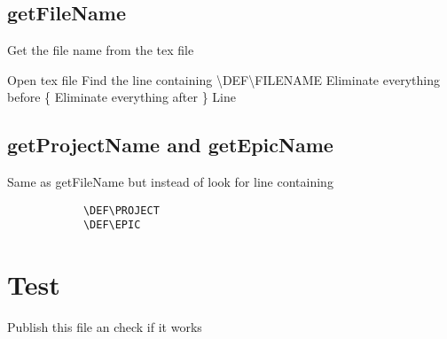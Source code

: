     \break

    \subsection{getFileName}
        \begin{algorithm}[h!]
            \caption{Get the file name from the tex file}
        \begin{algorithmic}
            \State Open tex file
            \State Find the line containing \textbackslash DEF\textbackslash FILENAME
            \State Eliminate everything before \{
            \State Eliminate everything after \}
            \State \Return Line
            \EndFunction
        \end{algorithmic}
        \end{algorithm}

    \subsection{getProjectName and getEpicName}
        Same as getFileName but instead of look for line containing
        \begin{verbatim}
            \DEF\PROJECT
            \DEF\EPIC
        \end{verbatim}

    \section{Test}
    Publish this file an check if it works
